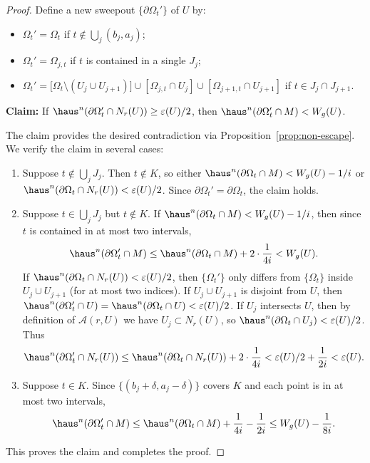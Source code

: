 \begin{proof}
Define a new sweepout $\{\partial\Omega_t'\}$ of $U$ by:
\begin{itemize}
    \item $\Omega_t'=\Omega_t$ if $t\notin\bigcup_j(b_j,a_j)$;
    \item $\Omega_t'=\Omega_{j,t}$ if $t$ is contained in a single $J_j$;
    \item $\Omega_t'=\bigl[\Omega_t\setminus(U_j\cup U_{j+1})\bigr]\cup[\Omega_{j,t}\cap U_j]\cup[\Omega_{j+1,t}\cap U_{j+1}]$ if $t\in J_j\cap J_{j+1}$.
\end{itemize}

\noindent\textbf{Claim:} If $\haus^n(\partial\Omega_t'\cap N_r(U))\ge \varepsilon(U)/2$, then $\haus^n(\partial\Omega_t'\cap M)<W_g(U)$.

The claim provides the desired contradiction via Proposition~\ref{prop:non-escape}. We verify the claim in several cases:

\begin{enumerate}[label=\textbf{Case \arabic*:}]
\item Suppose $t\notin\bigcup_j J_j$. Then $t\notin K$, so either $\haus^n(\partial\Omega_t\cap M)<W_g(U)-1/i$ or $\haus^n(\partial\Omega_t\cap N_r(U))<\varepsilon(U)/2$. Since $\partial\Omega_t'=\partial\Omega_t$, the claim holds.

\item Suppose $t\in\bigcup_j J_j$ but $t\notin K$. If $\haus^n(\partial\Omega_t\cap M)<W_g(U)-1/i$, then since $t$ is contained in at most two intervals,
\[
\haus^n(\partial\Omega_t'\cap M)\le \haus^n(\partial\Omega_t\cap M)+2\cdot\frac{1}{4i}<W_g(U).
\]
If $\haus^n(\partial\Omega_t\cap N_r(U))<\varepsilon(U)/2$, then $\{\Omega_t'\}$ only differs from $\{\Omega_t\}$ inside $U_j\cup U_{j+1}$ (for at most two indices). If $U_j\cup U_{j+1}$ is disjoint from $U$, then $\haus^n(\partial\Omega_t'\cap U)=\haus^n(\partial\Omega_t\cap U)<\varepsilon(U)/2$. If $U_j$ intersects $U$, then by definition of $\mathcal{A}(r,U)$ we have $U_j\subset N_r(U)$, so $\haus^n(\partial\Omega_t\cap U_j)<\varepsilon(U)/2$. Thus
\[
\haus^n(\partial\Omega_t'\cap N_r(U))\le \haus^n(\partial\Omega_t\cap N_r(U))+2\cdot\frac{1}{4i}<\varepsilon(U)/2+\frac{1}{2i}<\varepsilon(U).
\]

\item Suppose $t\in K$. Since $\{(b_j+\delta,a_j-\delta)\}$ covers $K$ and each point is in at most two intervals,
\[
\haus^n(\partial\Omega_t'\cap M)\le \haus^n(\partial\Omega_t\cap M)+\frac{1}{4i}-\frac{1}{2i}\le W_g(U)-\frac{1}{8i}.
\]
\end{enumerate}
This proves the claim and completes the proof.
\end{proof}

